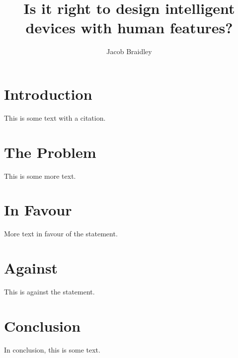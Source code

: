 \documentclass{article}
\title{Is it right to design intelligent devices with human features?}
\author{Jacob Braidley}
\begin{document}
\maketitle

\vspace{1cm}

\section{Introduction}
This is some text\cite{example2022example} with a citation.

\section{The Problem}
This is some more text.

\section{In Favour}
More text in favour of the statement.

\section{Against}
This is against the statement.

\section{Conclusion}
In conclusion, this is some text.

\vspace{.5cm}



\end{document}
